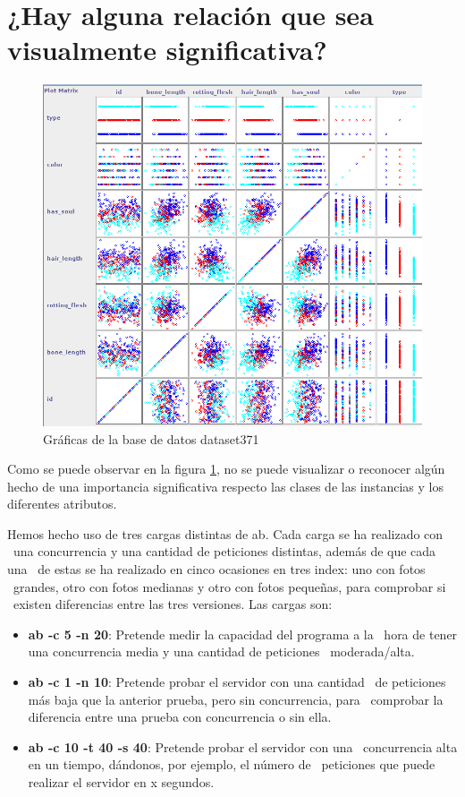 \documentclass[11pt,twoside,a4paper]{book}
\begin{document}
\section{¿Hay alguna relación que sea visualmente \break significativa?}
\begin{figure}[H]
   \includegraphics[width=\textwidth]{ejercicio4_5.png}
	\caption{Gráficas de la base de datos dataset371}
	\label{Fig10}
\end{figure}
Como se puede observar en la figura \ref{Fig10}, no se puede visualizar o reconocer
algún hecho de una importancia significativa respecto las clases de las instancias
y los diferentes atributos.

Hemos hecho uso de tres cargas distintas de ab. Cada carga se ha realizado con \
una concurrencia y una cantidad de peticiones distintas, además de que cada una \
de estas se ha realizado en cinco ocasiones en tres index: uno con fotos \
grandes, otro con fotos medianas y otro con fotos pequeñas, para comprobar si \
existen diferencias entre las tres versiones. Las cargas son:
\begin{itemize}
  \item \textbf{ab -c 5 -n 20}: Pretende medir la capacidad  del programa a la \
  hora de tener una concurrencia media y una cantidad de peticiones \
  moderada/alta.
  \item \textbf{ab -c 1 -n 10}: Pretende probar el servidor con una cantidad \
  de peticiones más baja que la anterior prueba, pero sin concurrencia, para \
  comprobar la diferencia entre una prueba con concurrencia o sin ella.
  \item \textbf{ab -c 10 -t 40 -s 40}: Pretende probar el servidor con una \
  concurrencia alta en un tiempo, dándonos, por ejemplo, el número de \
  peticiones que puede realizar el servidor en x segundos.
\end{itemize}
\end{document}
